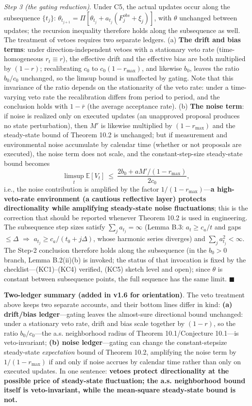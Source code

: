 \documentclass[
  11pt]{article}
\begin{document}
\emph{Step 3 (the gating reduction)}. Under C5, the actual updates occur
along the subsequence \(\{t_j\}\):
\(\theta_{t_{j+1}} = \Pi[\theta_{t_j} + a_{t_j}(F^{obs}_j + \xi_j)]\),
with \(\theta\) unchanged between updates; the recursion inequality
therefore holds along the subsequence as well. The treatment of vetoes
requires two separate ledgers. (a) \textbf{The drift and bias terms}:
under direction-independent vetoes with a stationary veto rate
(time-homogeneous \(r_t \equiv r\)), the effective drift and the
effective bias are both multiplied by \((1-r)\); recalibrating \(c_0\)
to \(c_0(1-r_{\max})\), and likewise \(b_0\), leaves the ratio
\(b_0/c_0\) unchanged, so the limsup bound is unaffected by gating. Note
that this invariance of the ratio depends on the stationarity of the
veto rate: under a time-varying veto rate the recalibration differs from
period to period, and the conclusion holds with \(1-\bar r\) (the
average acceptance rate). (b) \textbf{The noise term}: if noise is
realized only on executed updates (an unapproved proposal produces no
state perturbation), then \(M'\) is likewise multiplied by
\((1-r_{\max})\) and the steady-state bound of Theorem 10.2 is
unchanged; but if measurement and environmental noise accumulate by
calendar time (whether or not proposals are executed), the noise term
does not scale, and the constant-step-size steady-state bound becomes
\[\limsup_t \mathbb{E}[V_t] \ \le\ \frac{2b_0 + aM'/(1-r_{\max})}{2c_0},\]
i.e., the noise contribution is amplified by the factor
\(1/(1-r_{\max})\)---\textbf{a high-veto-rate environment (a cautious
reflective layer) protects directionality while amplifying steady-state
noise fluctuations}; this is the correction that should be reported
whenever Theorem 10.2 is used in engineering. The subsequence step sizes
satisfy \(\sum_j a_{t_j} = \infty\) (Lemma B.3: \(a_t \ge c_a/t\) and
gaps \(\le \Delta\) \(\Rightarrow\) \(a_{t_j} \ge c_a/(t_0 + j\Delta)\),
whose harmonic series diverges) and \(\sum_j a_{t_j}^2 < \infty\). The
Step-2 conclusion therefore holds along the subsequence (in the
\(b_0 > 0\) branch, Lemma B.2(ii)(b) is invoked; the status of that
invocation is fixed by the checklist---(KC1)--(KC4) verified, (KC5)
sketch level and open); since \(\theta\) is constant between subsequence
points, the full sequence has the same limit. \(\blacksquare\)

\textbf{Two-ledger summary (added in v1.6 for orientation)}. The veto
treatment above keeps two separate accounts, and their bottom lines
differ in kind: \textbf{(a) drift/bias ledger}---gating leaves the
almost-sure directional bound unchanged: under a stationary veto rate,
drift and bias scale together by \((1-r)\), so the ratio
\(b_0/c_0\)---the a.s. neighborhood radius of Theorem 10.1/Conjecture
10.1---is veto-invariant; \textbf{(b) noise ledger}---gating can change
the constant-stepsize steady-state \emph{expectation} bound of Theorem
10.2, amplifying the noise term by \(1/(1-r_{\max})\) if and only if
noise accrues by calendar time rather than only on executed updates. In
one sentence: \textbf{vetoes protect directionality at the possible
price of steady-state fluctuation; the a.s. neighborhood bound itself is
veto-invariant, while the mean-square steady-state bound is not.}
\end{document}
